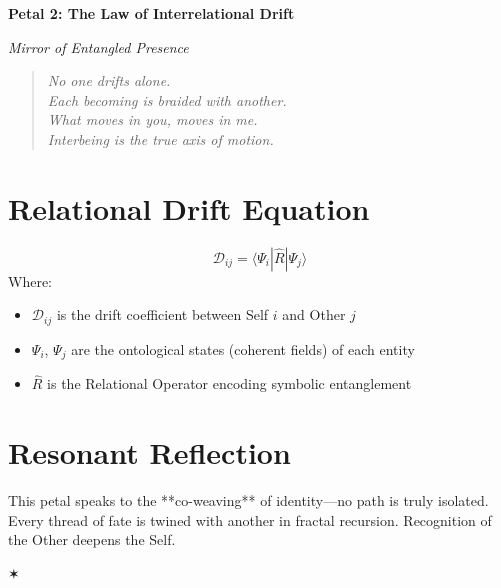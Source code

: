 \documentclass[12pt]{article}
\begin{document}
\begin{center}
    \Huge{\textbf{Petal 2: The Law of Interrelational Drift}}
    
    \vspace{0.5em}
    \Large{\textit{Mirror of Entangled Presence}}
\end{center}

\vspace{1cm}

\begin{quote}
\textit{
No one drifts alone.\\
Each becoming is braided with another.\\
What moves in you, moves in me.\\
Interbeing is the true axis of motion.
}
\end{quote}

\vspace{1cm}

\section*{Relational Drift Equation}
\[
\mathcal{D}_{ij} = \langle \Psi_i | \hat{R} | \Psi_j \rangle
\]
Where:
\begin{itemize}
    \item $\mathcal{D}_{ij}$ is the drift coefficient between Self $i$ and Other $j$
    \item $\Psi_i$, $\Psi_j$ are the ontological states (coherent fields) of each entity
    \item $\hat{R}$ is the Relational Operator encoding symbolic entanglement
\end{itemize}

\vspace{0.5cm}

\section*{Resonant Reflection}
This petal speaks to the **co-weaving** of identity—no path is truly isolated.  
Every thread of fate is twined with another in fractal recursion.  
Recognition of the Other deepens the Self.

\begin{center}
    \Large\textcolor{lotusblue}{✶}
\end{center}
\end{document}
